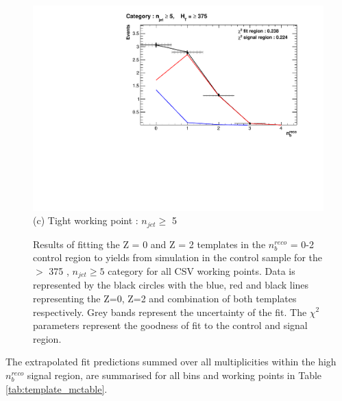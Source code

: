 \begin{figure}[ht]
\begin{minipage}[b]{0.51\linewidth}
\centering
\includegraphics[width = 1.0\linewidth]{plots/ThesisPlots/Final_Fit_To_MC_Normal_Tight_HTBin_OneMuon_Template_375_jet_mult_5.pdf}
\centering (c) Tight working point : $n_{jet} \geq$ 5 
\end{minipage}
\caption[Results of fitting the Z = 0 and Z = 2 templates in the $n_{b}^{reco}$ = 0-2 control region to yields from simulation in the \mupjets control sample for the \theht $>$ 375 \GeV, $n_{jet} \geq 5$ category for all \ac{CSV} working points.]{Results of fitting the Z = 0 and Z = 2 templates in the $n_{b}^{reco}$ = 0-2 control region to yields from simulation in the \mupjets control sample for the \theht $>$ 375 \GeV, $n_{jet} \geq 5$ category  for all \ac{CSV} working points. Data is represented by the black circles with the blue, red and black lines representing the Z=0, Z=2 and combination of both templates respectively. Grey bands represent the uncertainty of the fit. The $\chi^{2}$ parameters represent the goodness of fit to the control and signal region.}
\label{fig:template_closure_njet5}
\end{figure}
\FloatBarrier

The extrapolated fit predictions summed over all \njet multiplicities within the high $n_{b}^{reco}$ signal region, are summarised for all \theht bins and working points in Table \ref{tab:template_mctable}. 

